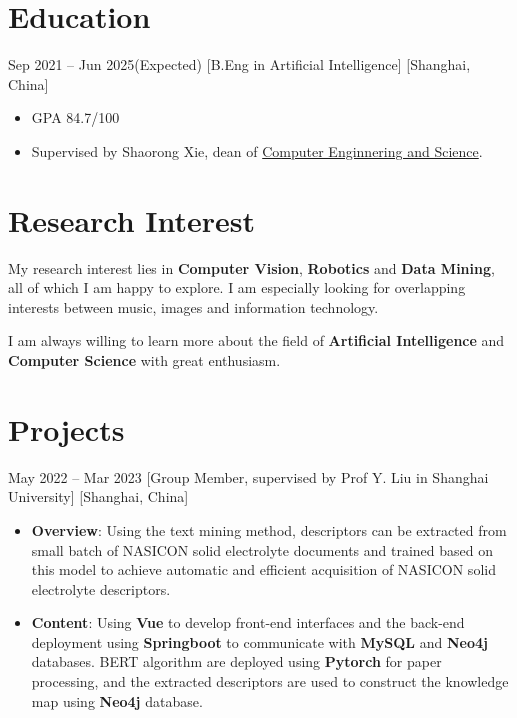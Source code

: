 \documentclass{chicv}
\begin{document}
\begin{basicinfo}
\end{basicinfo}


\section{Education}
  {Sep 2021 -- Jun 2025(Expected)}
  [B.Eng in Artificial Intelligence]
  [Shanghai, China]
  \begin{itemize}
    \item GPA 84.7/100
    \item Supervised by Shaorong Xie, dean of \href{https://cs.shu.edu.cn/}{Computer Enginnering and Science}.
  \end{itemize}

\section{Research Interest}
My research interest lies in \textbf{Computer Vision}, \textbf{Robotics} and \textbf{Data Mining}, all of which I am happy to explore. I am especially looking for overlapping interests between music, images and information technology.

I am always willing to learn more about the field of \textbf{Artificial Intelligence} and \textbf{Computer Science} with great enthusiasm.

\section{Projects}

  {May 2022 -- Mar 2023}
  [Group Member, supervised by Prof Y. Liu in Shanghai University]
  [Shanghai, China]
  \begin{itemize}
    \item \textbf{Overview}: Using the text mining method, descriptors can be extracted from small batch of NASICON solid electrolyte documents and trained based on this model to achieve automatic and efficient acquisition of NASICON solid electrolyte descriptors.
    \item \textbf{Content}: Using \textbf{Vue} to develop front-end interfaces and the back-end deployment using \textbf{Springboot} to communicate with \textbf{MySQL} and \textbf{Neo4j} databases. BERT algorithm are deployed using \textbf{Pytorch} for paper processing, and the extracted descriptors are used to construct the knowledge map using \textbf{Neo4j} database.
  \end{itemize}
\end{document}
